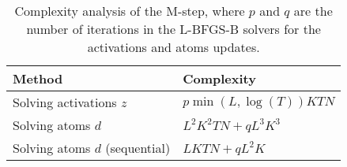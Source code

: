 \begin{table}[htb]
\begin{center}
\begin{tabular}{|l|l|}
\hline
Method & Complexity \\
\hline
Solving activations $z$ & $p\min(L, \log(T))KTN$ \\
Solving atoms $d$ & $L^2K^2TN + qL^3K^3$ \\
Solving atoms $d$ (sequential) & $LKTN + qL^2K$ \\
\hline
\end{tabular}
\vspace{5pt}
\caption[Complexity analysis of the M-step.]{Complexity analysis of the M-step, where $p$ and $q$ are the number of iterations in the L-BFGS-B solvers for the activations and atoms updates.}
\label{table:complexity_m}
\end{center}
\end{table}





